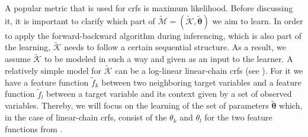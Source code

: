 A popular metric that is used for \glspl{crf} is \gls{maximum likelihood}.
Before discussing it, it is important to clarify which part of $\mathcal{\tilde{M}}=(\mathcal{\tilde{K}},\bm{\tilde{\theta}})$ we aim to learn.
In order to apply the forward-backward algorithm during inferencing, which is also part of the learning, $\mathcal{\tilde{K}}$ needs to follow a certain sequential structure.
As a result, we assume $\mathcal{\tilde{K}}$ to be modeled in such a way and given as an input to the learner.
A relatively simple model for $\mathcal{\tilde{K}}$ can be a log-linear \glspl{linear-chain crf} (see ). For it we have a \gls{feature function} $\tilde{f}_k$ between two neighboring \glspl{target variable} and a \gls{feature function} $\tilde{f}_l$ between a \gls{target variable} and its context given by a set of \glspl{observed variable}.
Thereby, we will focus on the learning of the set of parameters $\bm{\tilde{\theta}}$ which, in the case of \glspl{linear-chain crf}, consist of the $\theta_k$ and $\theta_l$ for the two \glspl{feature function} from .

